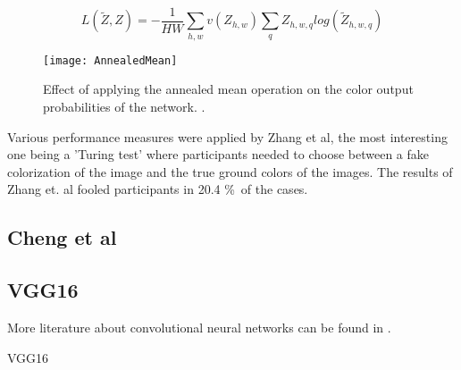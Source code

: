 \begin{equation}
L(\widetilde{Z},Z)=-\frac{1}{HW}\sum_{h,w}v(Z_{h,w})\sum_q^{}{Z_{h,w,q}log({\widetilde{Z}_{h,w,q}})}
\label{eq:lossZhang}
\end{equation}

\begin{figure}
\centering
	\texttt{[image: AnnealedMean]}
\centering
\caption{Effect of applying the annealed mean operation on the  color output probabilities of the network. \cite{yu2015multi}.}
\label{fig:anmean}
\end{figure}

Various performance measures were applied by Zhang et al, the most interesting one being a 'Turing test' where participants needed to choose between a fake colorization of the image and the true ground colors of the images. The results of Zhang et. al fooled participants in 20.4 \%\ of the cases. 



\subsection{Cheng et al}

\subsection{VGG16}




More literature about convolutional neural networks can be found in \cite{GoodfellowBOOK}. 


%

VGG16




